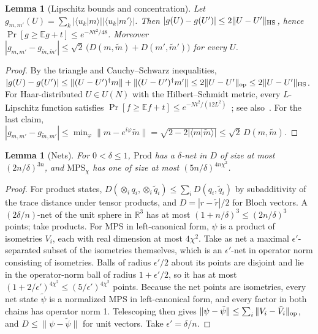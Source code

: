 \documentclass[11pt]{article}
\newtheorem{lemma}[theorem]{Lemma}
\theoremstyle{definition}
\theoremstyle{remark}
\newcommand{\braket}[2]{\langle #1|#2\rangle}
\newcommand{\Prod}{\mathrm{Prod}}
\newcommand{\MPS}{\mathrm{MPS}}
\newcommand{\E}{\mathbb{E}}
\begin{document}
\begin{lemma}[Lipschitz bounds and concentration]\label{lem:conc}
Let $g_{m,m'}(U)=\sum_k|\braket{u_k}{m}||\braket{u_k}{m'}|$. Then $|g(U)-g(U')|\le2\|U-U'\|_{\rm HS}$, hence $\Pr[g\ge\E g+t]\le e^{-Nt^2/48}$. Moreover $|g_{m,m'}-g_{\tilde m,\tilde m'}|\le\sqrt2\,\big(D(m,\tilde m)+D(m',\tilde m')\big)$ for every $U$.
\end{lemma}
\begin{proof}
By the triangle and Cauchy--Schwarz inequalities, $|g(U)-g(U')|\le\|(U-U')^\dagger m\|+\|(U-U')^\dagger m'\|\le2\|U-U'\|_{\rm op}\le2\|U-U'\|_{\rm HS}$. For Haar-distributed $U\in U(N)$ with the Hilbert--Schmidt metric, every $L$-Lipschitz function satisfies $\Pr[f\ge\E f+t]\le e^{-Nt^2/(12L^2)}$~\cite[Cor.~17]{MeckesMeckes2013}; see also~\cite[Ch.~5]{Meckes2019}. For the last claim, $|g_{m,m'}-g_{\tilde m,m'}|\le\min_\varphi\|m-e^{i\varphi}\tilde m\|=\sqrt{2-2|\braket{m}{\tilde m}|}\le\sqrt2\,D(m,\tilde m)$.
\end{proof}

\begin{lemma}[Nets]\label{lem:nets}
For $0<\delta\le1$, $\Prod$ has a $\delta$-net in $D$ of size at most $(2n/\delta)^{3n}$, and $\MPS_\chi$ has one of size at most $(5n/\delta)^{4n\chi^2}$.
\end{lemma}
\begin{proof}
For product states, $D(\otimes_i q_i,\otimes_i\tilde q_i)\le\sum_iD(q_i,\tilde q_i)$ by subadditivity of the trace distance under tensor products, and $D=|r-\tilde r|/2$ for Bloch vectors. A $(2\delta/n)$-net of the unit sphere in $\mathbb R^3$ has at most $(1+n/\delta)^3\le(2n/\delta)^3$ points; take products. For MPS in left-canonical form, $\psi$ is a product of isometries $V_i$, each with real dimension at most $4\chi^2$. Take as net a maximal $\epsilon'$-separated subset of the isometries themselves, which is an $\epsilon'$-net in operator norm consisting of isometries. Balls of radius $\epsilon'/2$ about its points are disjoint and lie in the operator-norm ball of radius $1+\epsilon'/2$, so it has at most $(1+2/\epsilon')^{4\chi^2}\le(5/\epsilon')^{4\chi^2}$ points. Because the net points are isometries, every net state $\tilde\psi$ is a normalized MPS in left-canonical form, and every factor in both chains has operator norm 1. Telescoping then gives $\|\psi-\tilde\psi\|\le\sum_i\|V_i-\tilde V_i\|_{\rm op}$, and $D\le\|\psi-\tilde\psi\|$ for unit vectors. Take $\epsilon'=\delta/n$.
\end{proof}
\end{document}
